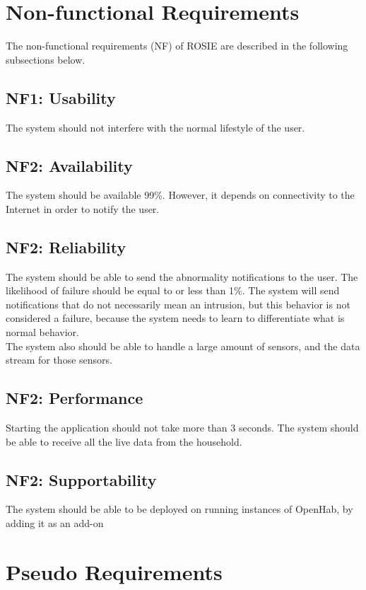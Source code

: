 \section{Non-functional Requirements}

The non-functional requirements (NF) of ROSIE are described in the following subsections below.

\subsection{NF1: Usability}
The system should not interfere with the normal lifestyle of the user.

\subsection{NF2: Availability}
The system should be available 99\%. However, it depends on connectivity to the Internet in order to notify the user.	

\subsection{NF2: Reliability}
The system should be able to send the abnormality notifications to the user. The likelihood of failure should be equal to or less than 1\%. The system will send notifications that do not necessarily mean an intrusion, but this behavior is not considered a failure, because the system needs to learn to differentiate what is normal behavior.  \\
The system also should be able to handle a large amount of sensors, and the data stream for those sensors.

\subsection{NF2: Performance}
Starting the application should not take more than 3 seconds. The system should be able to receive all the live data from the household.

\subsection{NF2: Supportability}
The system should be able to be deployed on running instances of OpenHab, by adding it as an add-on


\section{Pseudo Requirements} %

